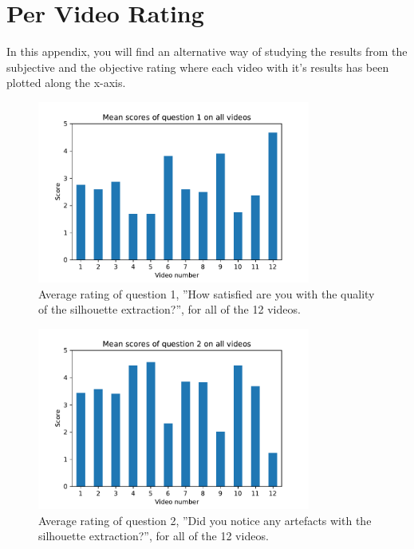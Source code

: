 \chapter{Per Video Rating}\label{cha:appendix-video-rating}
In this appendix, you will find an alternative way of studying the results from the subjective and the objective rating where each video with it's results has been plotted along the x-axis.

\begin{figure}[H]
    \centering
    \includegraphics[width=0.8\textwidth]{img/questions/question_1.pdf}
    \caption{Average rating of question 1, ''How satisfied are you with the quality of the silhouette extraction?'', for all of the 12 videos.}
    \label{fig:video_rating_q1}
\end{figure}

\begin{figure}[H]
    \centering
    \includegraphics[width=0.8\textwidth]{img/questions/question_2.pdf}
    \caption{Average rating of question 2, ''Did you notice any artefacts with the silhouette extraction?'', for all of the 12 videos.}
    \label{fig:video_rating_q2}
\end{figure}



